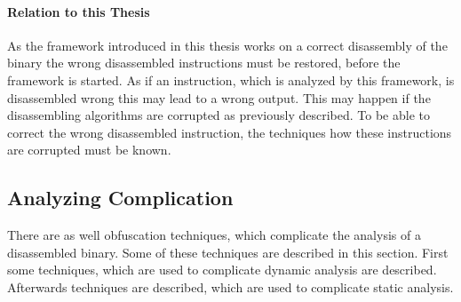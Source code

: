 \documentclass[10pt,twoside,a4paper,bibliography=totoc]{scrbook}
\begin{document}
\paragraph*{Relation to this Thesis}
As the framework introduced in this thesis works on a correct disassembly of 
the binary the wrong disassembled instructions must be restored, before 
the framework is started. 
As if an instruction, which is analyzed by this framework, is disassembled wrong
this may lead to a wrong output.
This may happen if the disassembling algorithms are corrupted as previously 
described.
To be able to correct the wrong disassembled instruction, the techniques 
how these instructions are corrupted must be known.

\subsection{Analyzing Complication}
\label{sec2:anaobfu}
There are as well obfuscation techniques, which complicate the analysis of a
disassembled binary.
Some of these techniques are described in this section.
First some techniques, which are used to complicate dynamic analysis are
described. 
Afterwards techniques are described, which are used to complicate static analysis.
\end{document}
